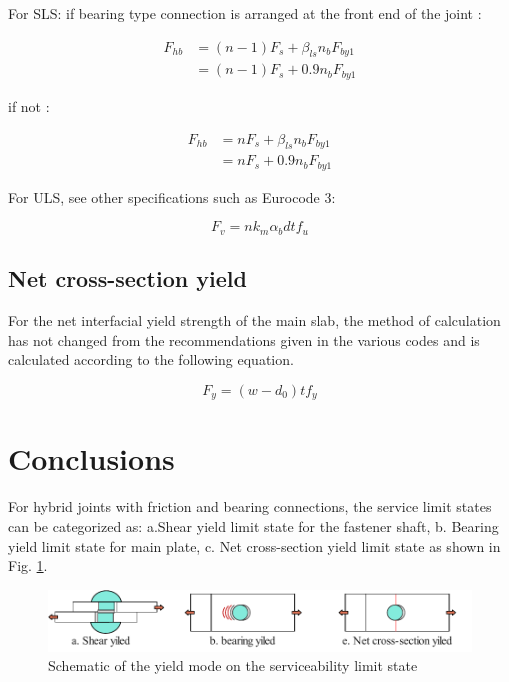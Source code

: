 For SLS:
if bearing type connection is arranged at the front end of the joint :

\begin{equation}
\begin{aligned}
    F_{hb} &= (n-1) F_s + \beta_{ls} n_b F_{by1}\\
           &= (n-1) F_s + 0.9 n_b F_{by1}
\end{aligned}
\end{equation}

if not :

\begin{equation}
\begin{aligned}
    F_{hb} &= n F_s + \beta_{ls} n_b F_{by1}\\
           &= n F_s + 0.9 n_b F_{by1}
\end{aligned}
\end{equation}

For ULS, see other specifications such as Eurocode 3:

\begin{equation}
    F_v = n k_m \alpha_b d t f_{u}
\end{equation}


\subsection{Net cross-section yield}

For the net interfacial yield strength of the main slab, the method of calculation has not changed from the recommendations given in the various codes and is calculated according to the following equation.

\begin{equation}
    F_y = (w-d_0) t f_y
\end{equation}



\section{Conclusions}

For hybrid joints with friction and bearing connections, the service limit states can be categorized as: a.Shear yield limit state for the fastener shaft, b. Bearing yield limit state for main plate, c. Net cross-section yield limit state as shown in Fig. \ref{fig-schehysls}.

\begin{figure}[htbp]
    \centering
    \includegraphics{imgs/ch7/sche-hy-sls.pdf}
    \caption{Schematic of the yield mode on the serviceability limit state}
    \label{fig-schehysls}
\end{figure}

